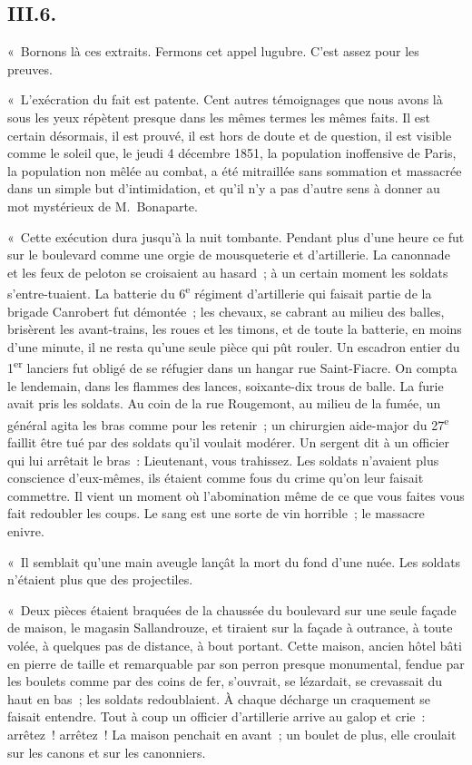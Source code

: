 \documentclass[french,twoside]{book} %
\begin{document}
\subsection[{III.6.}]{III.6.}
\noindent « Bornons là ces extraits. Fermons cet appel lugubre. C’est assez pour les preuves.\par
« L’exécration du fait est patente. Cent autres témoignages que nous avons là sous les yeux répètent presque dans les mêmes termes les mêmes faits. Il est certain désormais, il est prouvé, il est hors de doute et de question, il est visible comme le soleil que, le jeudi 4 décembre 1851, la population inoffensive de Paris, la population non mêlée au combat, a été mitraillée sans sommation et massacrée dans un simple but d’intimidation, et qu’il n’y a pas d’autre sens à donner au mot mystérieux de M. Bonaparte.\par
« Cette exécution dura jusqu’à la nuit tombante. Pendant plus d’une heure ce fut sur le boulevard comme une orgie de mousqueterie et d’artillerie. La canonnade et les feux de peloton se croisaient au hasard ; à un certain moment les soldats s’entre-tuaient. La batterie du 6\textsuperscript{e} régiment d’artillerie qui faisait partie de la brigade Canrobert fut démontée ; les chevaux, se cabrant au milieu des balles, brisèrent les avant-trains, les roues et les timons, et de toute la batterie, en moins d’une minute, il ne resta qu’une seule pièce qui pût rouler. Un escadron entier du 1\textsuperscript{er} lanciers fut obligé de se réfugier dans un hangar rue Saint-Fiacre. On compta le lendemain, dans les flammes des lances, soixante-dix trous de balle. La furie avait pris les soldats. Au coin de la rue Rougemont, au milieu de la fumée, un général agita les bras comme pour les retenir ; un chirurgien aide-major du 27\textsuperscript{e} faillit être tué par des soldats qu’il voulait modérer. Un sergent dit à un officier qui lui arrêtait le bras : Lieutenant, vous trahissez. Les soldats n’avaient plus conscience d’eux-mêmes, ils étaient comme fous du crime qu’on leur faisait commettre. Il vient un moment où l’abomination même de ce que vous faites vous fait redoubler les coups. Le sang est une sorte de vin horrible ; le massacre enivre.\par
« Il semblait qu’une main aveugle lançât la mort du fond d’une nuée. Les soldats n’étaient plus que des projectiles.\par
« Deux pièces étaient braquées de la chaussée du boulevard sur une seule façade de maison, le magasin Sallandrouze, et tiraient sur la façade à outrance, à toute volée, à quelques pas de distance, à bout portant. Cette maison, ancien hôtel bâti en pierre de taille et remarquable par son perron presque monumental, fendue par les boulets comme par des coins de fer, s’ouvrait, se lézardait, se crevassait du haut en bas ; les soldats redoublaient. À chaque décharge un craquement se faisait entendre. Tout à coup un officier d’artillerie arrive au galop et crie : arrêtez ! arrêtez ! La maison penchait en avant ; un boulet de plus, elle croulait sur les canons et sur les canonniers.\par
\end{document}
